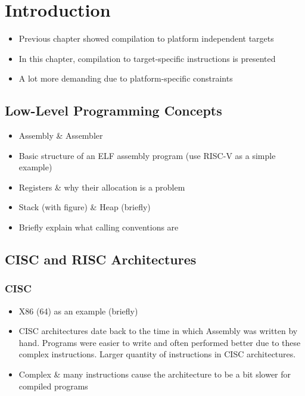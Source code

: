 \section{Introduction}

\begin{itemize}
	\item Previous chapter showed compilation to platform independent targets
	\item In this chapter, compilation to target-specific instructions is presented
	\item A lot more demanding due to platform-specific constraints
\end{itemize}

\subsection{Low-Level Programming Concepts}

\begin{itemize}
	\item Assembly \& Assembler
	\item Basic structure of an ELF assembly program (use RISC-V as a simple example)
	\item Registers \& why their allocation is a problem
	\item Stack (with figure) \& Heap (briefly)
	\item Briefly explain what calling conventions are
\end{itemize}

\subsection{CISC and RISC Architectures}

\subsubsection{CISC}
\begin{itemize}
	\item X86 (64) as an example (briefly)
	\item CISC architectures date back to the time in which Assembly was written by hand.
	      Programs were easier to write and often performed better due to these complex instructions.
	      Larger quantity of instructions in CISC architectures.
	\item Complex \& many instructions cause the architecture to be a bit slower for compiled programs
\end{itemize}

